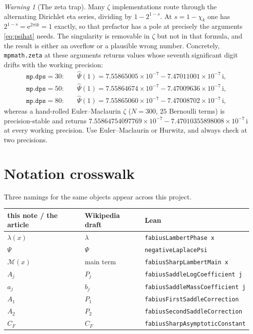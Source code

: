 \documentclass[11pt,oneside]{article}
\theoremstyle{definition}
\theoremstyle{remark}
\newtheorem{warning}[theorem]{Warning}
\newcommand{\e}{\mathrm e}
\newcommand{\ii}{\mathrm i}
\newcommand{\Psihat}{\widehat\Psi}
\begin{document}
\begin{warning}[The zeta trap]
Many $\zeta$ implementations route through the alternating Dirichlet eta
series, dividing by $1-2^{1-s}$.  At $s=1-\chi_k$ one has
$2^{1-s}=\e^{2\pi\ii k}=1$ exactly, so that prefactor has a pole at precisely
the arguments \cref{eq:psihat} needs.  The singularity is removable in $\zeta$
but not in that formula, and the result is either an overflow or a plausible
wrong number.  Concretely, \texttt{mpmath.zeta} at these arguments returns
values whose seventh significant digit drifts with the working precision:
\[
\begin{aligned}
  \texttt{mp.dps}=30:&\quad \Psihat(1)=7.55865005\times10^{-7}-7.47011001\times10^{-7}\,\ii,\\
  \texttt{mp.dps}=50:&\quad \Psihat(1)=7.55864674\times10^{-7}-7.47009636\times10^{-7}\,\ii,\\
  \texttt{mp.dps}=80:&\quad \Psihat(1)=7.55865060\times10^{-7}-7.47008702\times10^{-7}\,\ii,
\end{aligned}
\]
whereas a hand-rolled Euler--Maclaurin $\zeta$ ($N=300$, $25$ Bernoulli terms)
is precision-stable and returns
$7.55864754097769\times10^{-7}-7.47010355898008\times10^{-7}\,\ii$ at every
working precision.  Use Euler--Maclaurin or Hurwitz, and always check at two
precisions.
\end{warning}

\section{Notation crosswalk}\label{sec:crosswalk}

Three namings for the same objects appear across this project.

\begin{center}
\begin{tabular}{@{}lll@{}}
\toprule
this note / the article & Wikipedia draft & Lean\\
\midrule
$\lambda(x)$ & $\lambda$ & \texttt{fabiusLambertPhase x}\\
$\Psi$ & $\Psi$ & \texttt{negativeLaplacePsi}\\
$\mathcal M(x)$ & main term & \texttt{fabiusSharpLambertMain x}\\
$A_j$ & $P_j$ & \texttt{fabiusSaddleLogCoefficient j}\\
$a_j$ & $b_j$ & \texttt{fabiusSaddleMassCoefficient j}\\
$A_1$ & $P_1$ & \texttt{fabiusFirstSaddleCorrection}\\
$A_2$ & $P_2$ & \texttt{fabiusSecondSaddleCorrection}\\
$C_F$ & $C_F$ & \texttt{fabiusSharpAsymptoticConstant}\\
\bottomrule
\end{tabular}
\end{center}
\end{document}
